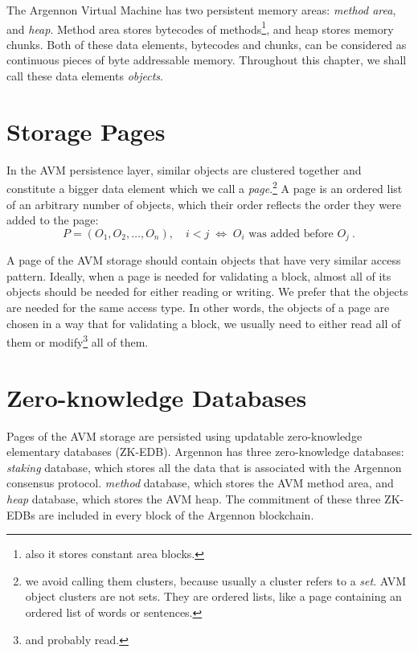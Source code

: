 
The Argennon Virtual Machine has two persistent memory areas: \emph{method area}, and \emph{heap}. Method area stores
bytecodes of methods\footnote{also it stores constant area blocks.}, and heap stores memory chunks. Both of these
data elements, bytecodes and chunks, can be considered as continuous pieces of byte addressable memory. Throughout this
chapter, we shall call these data elements \emph{objects}.


\section{Storage Pages}\label{sec:storage-pages}

In the AVM persistence layer, similar objects are clustered together and constitute a bigger data element which we call
a \emph{page}.\footnote{we avoid calling them clusters, because usually a cluster refers to a \emph{set}. AVM object
clusters are not sets. They are ordered lists, like a page containing an ordered list of words or sentences.}
A page is an ordered list of an arbitrary number of objects, which their order reflects the order they were added to
the page:
\[
    P = (O_1,O_2,\dots,O_n),\quad i < j \; \Leftrightarrow \; \textrm{$O_i$ was added before $O_j$}\ .
\]

A page of the AVM storage should contain objects that have very similar access pattern. Ideally, when a page is needed
for validating a block, almost all of its objects should be needed for either reading or writing. We prefer
that the objects are needed for the same access type. In other words, the objects of a page are chosen in a way that
for validating a block, we usually need to either read all of them or modify\footnote{and probably read.} all of them.

\section{Zero-knowledge Databases}\label{sec:zk-edb}

Pages of the AVM storage are persisted using updatable zero-knowledge elementary databases (ZK-EDB). Argennon
has three zero-knowledge databases: \emph{staking} database, which stores all the data that is associated with
the Argennon consensus protocol. \emph{method} database, which stores the AVM method area, and \emph{heap} database,
which stores the AVM heap. The commitment of these three ZK-EDBs are included in every block of the Argennon blockchain.

